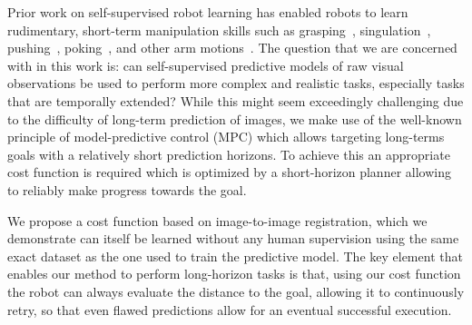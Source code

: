 Prior work on self-supervised robot learning has enabled robots to learn rudimentary, short-term manipulation skills such as grasping~\cite{lerrel,google_handeye}, singulation~\cite{princeton_pushgrasp}, pushing~\cite{foresight,sna}, poking~\cite{pulkit}, and other arm motions~\cite{se3_control}. The question that we are concerned with in this work is: can self-supervised predictive models of raw visual observations be used to perform more complex and realistic tasks, especially tasks that are temporally extended? 
While this might seem exceedingly challenging due to the difficulty of long-term prediction of images, we make use of the well-known principle of model-predictive control (MPC) which allows targeting long-terms goals with a relatively short prediction horizons. To achieve this an appropriate cost function is required which is optimized by a short-horizon planner allowing to reliably make progress towards the goal. 

We propose a cost function based on image-to-image registration, which we demonstrate can itself be learned without any human supervision using the same exact dataset as the one used to train the predictive model. The key element that enables our method to perform long-horizon tasks is that, using our cost function the robot can always evaluate the distance to the goal, allowing it to continuously retry, so that even flawed predictions allow for an eventual successful execution. 



